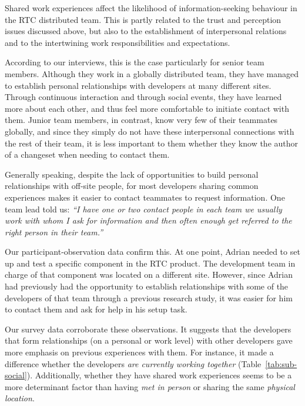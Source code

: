 Shared work experiences affect the likelihood of information-seeking behaviour in the RTC distributed team. This is partly related to the trust and perception issues discussed above, but also to the establishment of interpersonal relations and to the intertwining work responsibilities and expectations.
\vspace{-2pt}

According to our interviews, this is the case particularly for senior team members. Although they work in a globally distributed team, they have managed to establish personal relationships with developers at many different sites. Through continuous interaction and through social events, they have learned more about each other, and thus feel more comfortable to initiate contact with them. Junior team members, in contrast, know very few of their teammates globally, and since they simply do not have these interpersonal connections with the rest of their team, it is less important to them whether they know the author of a changeset when needing to contact them.
\vspace{-2pt}

Generally speaking, despite the lack of opportunities to build personal relationships with off-site people, for most developers sharing common experiences makes it easier to contact teammates to request information. One team lead told us: \emph{``I have one or two contact people in each team we usually work with whom I ask for information and then often enough get referred to the right person in their team.''}
\vspace{-2pt}

Our participant-observation data confirm this. At one point, Adrian needed to set up and test a specific component in the RTC product. The development team in charge of that component was located on a different site. However, since Adrian had previously had the opportunity to establish relationships with some of the developers of that team through a previous research study, it was easier for him to contact them and ask for help in his setup task.
\vspace{-2pt}

Our survey data corroborate these observations. It suggests that the developers that form relationships (on a personal or work level) with other developers gave more emphasis on previous experiences with them. For instance, it made a difference whether the developers \emph{are currently working together} (Table~\ref{tab:sub-social}). Additionally, whether they have shared work experiences seems to be a more determinant factor than having \emph{met in person} or sharing the same \emph{physical location}.

